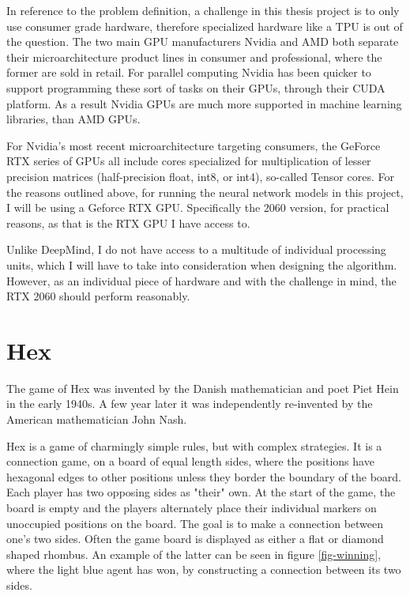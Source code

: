 In reference to the problem definition, a challenge in this thesis project is to only use consumer grade hardware, therefore specialized hardware like a TPU is out of the question. The two main GPU manufacturers Nvidia and AMD both separate their microarchitecture product lines in consumer and professional, where the former are sold in retail. For parallel computing Nvidia has been quicker to support programming these sort of tasks on their GPUs, through their CUDA platform. As a result Nvidia GPUs are much more supported in machine learning libraries, than AMD GPUs.

For Nvidia's most recent microarchitecture targeting consumers, the GeForce RTX series of GPUs all include cores specialized for multiplication of lesser precision matrices (half-precision float, int8, or int4), so-called Tensor cores\cite{NVIDIACorporation2018}. For the reasons outlined above, for running the neural network models in this project, I will be using a Geforce RTX GPU. Specifically the 2060 version, for practical reasons, as that is the RTX GPU I have access to.

Unlike DeepMind, I do not have access to a multitude of individual processing units, which I will have to take into consideration when designing the algorithm. However, as an individual piece of hardware and with the challenge in mind, the RTX 2060 should perform reasonably.

\section{Hex}
The game of Hex was invented by the Danish mathematician and poet Piet Hein in the early 1940s. A few year later it was independently re-invented by the American mathematician John Nash\cite{Huang2014}.

Hex is a game of charmingly simple rules, but with complex strategies. It is a connection game, on a board of equal length sides, where the positions have hexagonal edges to other positions unless they border the boundary of the board. Each player has two opposing sides as "their" own. At the start of the game, the board is empty and the players alternately place their individual markers on unoccupied positions on the board. The goal is to make a connection between one's two sides. Often the game board is displayed as either a flat or diamond shaped rhombus. An example of the latter can be seen in figure \ref{fig-winning}, where the light blue agent has won, by constructing a connection between its two sides.

